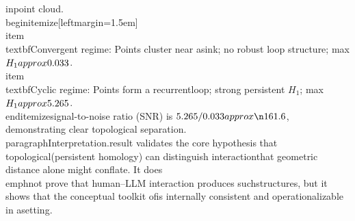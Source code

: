 \documentclass[11pt]{article}
\begin{document}
in\nthe point cloud.\n\\begin{itemize}[leftmargin=1.5em]\n  \\item \\textbf{Convergent regime}: Points cluster near a\n        sink; no robust loop structure; max $H_1 \\approx 0.033$.\n  \\item \\textbf{Cyclic regime}: Points form a recurrent\n        loop; strong persistent $H_1$; max $H_1 \\approx 5.265$.\n\\end{itemize}\nThe signal-to-noise ratio (SNR) is $5.265 / 0.033 \\approx\n161.6$, demonstrating clear topological separation.\n\n\\paragraph{Interpretation.}\nThis result validates the core hypothesis that topological\nstructure (persistent homology) can distinguish interaction\nregimes that geometric distance alone might conflate. It does\n\\emph{not} prove that human--LLM interaction produces such\nloop structures, but it shows that the conceptual toolkit of\nLEM is internally consistent and operationalizable in a\ncontrolled setting.\n\n%
\end{document}
